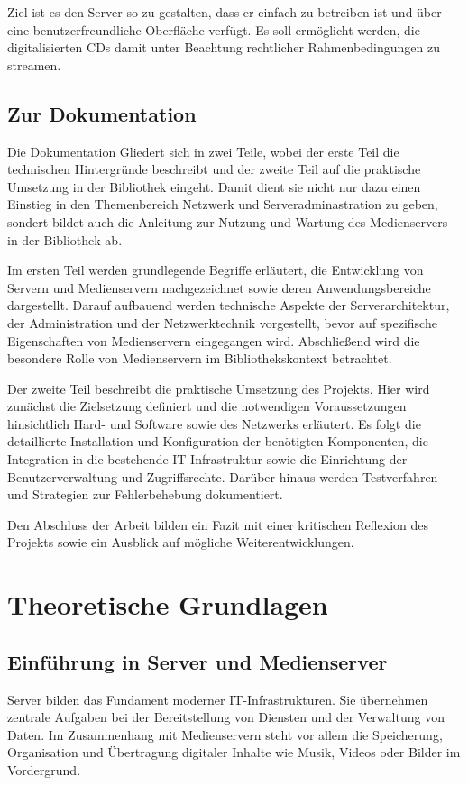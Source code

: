 \documentclass[12pt,a4paper]{report}
\begin{document}
Ziel ist es den Server so zu gestalten, dass er einfach zu betreiben ist und über eine benutzerfreundliche Oberfläche verfügt.
Es soll ermöglicht werden, die digitalisierten CDs damit unter Beachtung rechtlicher Rahmenbedingungen zu streamen.

\section{Zur Dokumentation}
Die Dokumentation Gliedert sich in zwei Teile, wobei der erste Teil die technischen Hintergründe beschreibt
und der zweite Teil auf die praktische Umsetzung in der Bibliothek eingeht.
Damit dient sie nicht nur dazu einen Einstieg in den Themenbereich Netzwerk und Serveradminastration zu geben, 
sondert bildet auch die Anleitung zur Nutzung und Wartung des Medienservers in der Bibliothek ab.

Im ersten Teil werden grundlegende Begriffe erläutert, 
die Entwicklung von Servern und Medienservern nachgezeichnet 
sowie deren Anwendungsbereiche dargestellt. 
Darauf aufbauend werden technische Aspekte der Serverarchitektur, 
der Administration und der Netzwerktechnik vorgestellt, 
bevor auf spezifische Eigenschaften von Medienservern eingegangen wird. 
Abschließend wird die besondere Rolle von Medienservern im 
Bibliothekskontext betrachtet. 

Der zweite Teil beschreibt die praktische Umsetzung des Projekts. 
Hier wird zunächst die Zielsetzung definiert und die notwendigen 
Voraussetzungen hinsichtlich Hard- und Software sowie des Netzwerks erläutert. 
Es folgt die detaillierte Installation und Konfiguration der 
benötigten Komponenten, die Integration in die bestehende IT-Infrastruktur 
sowie die Einrichtung der Benutzerverwaltung und Zugriffsrechte. 
Darüber hinaus werden Testverfahren und Strategien zur 
Fehlerbehebung dokumentiert. 

Den Abschluss der Arbeit bilden ein Fazit mit einer 
kritischen Reflexion des Projekts sowie ein Ausblick 
auf mögliche Weiterentwicklungen.

\chapter*{Theoretische Grundlagen}
\setcounter{section}{0}

\section{Einführung in Server und Medienserver}
Server bilden das Fundament moderner IT-Infrastrukturen.
Sie übernehmen zentrale Aufgaben bei der Bereitstellung von Diensten 
und der Verwaltung von Daten. 
Im Zusammenhang mit Medienservern steht vor allem die Speicherung, 
Organisation und Übertragung digitaler Inhalte wie Musik, 
Videos oder Bilder im Vordergrund. 
\end{document}
